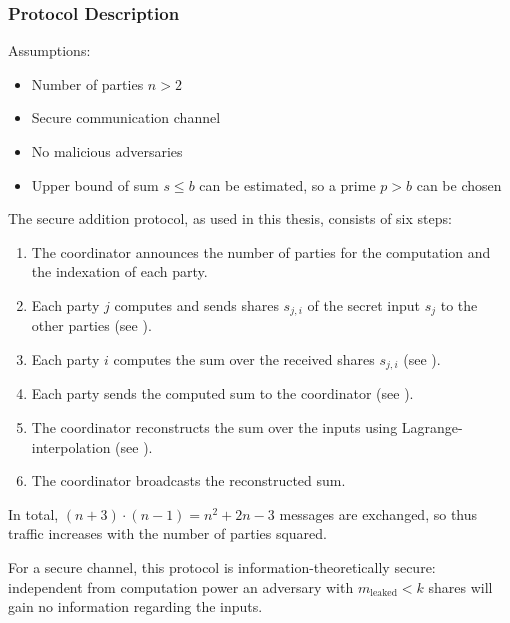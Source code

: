 \subsubsection{Protocol Description}
Assumptions:
\begin{itemize}
	\item Number of parties $n>2$
	\item Secure communication channel
	\item No malicious adversaries
	\item Upper bound of sum $s \leq b$ can be estimated, so a prime $p > b$ can be chosen 
\end{itemize}
The secure addition protocol, as used in this thesis, consists of six steps:
\begin{enumerate}
	\item The coordinator announces the number of parties for the computation and the indexation of each party.
	\item Each party $j$ computes and sends shares $s_{j,i}$ of the secret input $s_j$ to the other parties (see ).
	\item Each party $i$ computes the sum over the received shares $s_{j,i}$ (see ).
	\item Each party sends the computed sum to the coordinator (see ).
	\item The coordinator reconstructs the sum over the inputs using Lagrange-interpolation (see ).
	\item The coordinator broadcasts the reconstructed sum.
\end{enumerate}

In total, $(n+3)\cdot (n-1)=n^2+2n-3$ messages are exchanged, so thus traffic increases with the number of parties squared. 

For a secure channel, this protocol is information-theoretically secure: independent from computation power an adversary with $m_\text{leaked}<k$ shares will gain no information regarding the inputs.


